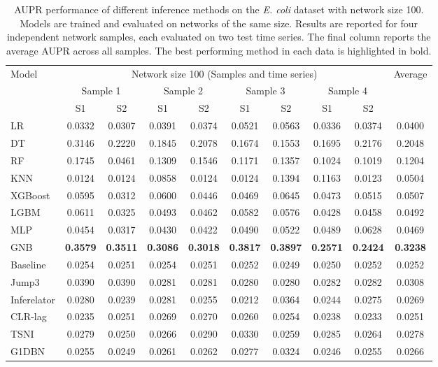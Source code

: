 \begin{table}[!h]
\centering
\caption{AUPR performance of different inference methods on the \textit{E. coli} dataset with network size 100. Models are trained and evaluated on networks of the same size. Results are reported for four independent network samples, each evaluated on two test time series. The final column reports the average AUPR across all samples. The best performing method in each data is highlighted in bold.}
\label{tab:size100}
{\renewcommand{\arraystretch}{0.6}
\setlength{\tabcolsep}{2pt}
\begin{tabular}{lcccccccc c}
\toprule
Model
& \multicolumn{8}{c}{Network size 100 (Samples and time series)}
& Average \\
\cmidrule(lr){2-9}
& \multicolumn{2}{c}{Sample 1}
& \multicolumn{2}{c}{Sample 2}
& \multicolumn{2}{c}{Sample 3}
& \multicolumn{2}{c}{Sample 4}
& \\
\cmidrule(lr){2-3}\cmidrule(lr){4-5}\cmidrule(lr){6-7}\cmidrule(lr){8-9}
& S1 & S2 & S1 & S2 & S1 & S2 & S1 & S2 & \\
\midrule
LR
& 0.0332 & 0.0307 & 0.0391 & 0.0374 & 0.0521 & 0.0563 & 0.0336 & 0.0374 & 0.0400 \\
DT
& 0.3146 & 0.2220 & 0.1845 & 0.2078 & 0.1674 & 0.1553 & 0.1695 & 0.2176 & 0.2048 \\
RF
& 0.1745 & 0.0461 & 0.1309 & 0.1546 & 0.1171 & 0.1357 & 0.1024 & 0.1019 & 0.1204 \\
KNN
& 0.0124 & 0.0124 & 0.0858 & 0.0124 & 0.0124 & 0.1394 & 0.1163 & 0.0123 & 0.0504 \\
XGBoost
& 0.0595 & 0.0312 & 0.0600 & 0.0446 & 0.0469 & 0.0645 & 0.0473 & 0.0515 & 0.0507 \\
LGBM
& 0.0611 & 0.0325 & 0.0493 & 0.0462 & 0.0582 & 0.0576 & 0.0428 & 0.0458 & 0.0492 \\
MLP
& 0.0454 & 0.0317 & 0.0430 & 0.0422 & 0.0490 & 0.0522 & 0.0489 & 0.0628 & 0.0469 \\
GNB
& \textbf{0.3579} & \textbf{0.3511} & \textbf{0.3086} & \textbf{0.3018}
& \textbf{0.3817} & \textbf{0.3897} & \textbf{0.2571} & \textbf{0.2424}
& \textbf{0.3238} \\
\midrule
Baseline
& 0.0254 & 0.0251 & 0.0254 & 0.0251 & 0.0252 & 0.0249 & 0.0250 & 0.0252 & 0.0252 \\
Jump3
& 0.0390 & 0.0390 & 0.0281 & 0.0281 & 0.0280 & 0.0280 & 0.0282 & 0.0282 & 0.0308 \\
Inferelator
& 0.0280 & 0.0239 & 0.0281 & 0.0255 & 0.0212 & 0.0364 & 0.0244 & 0.0275 & 0.0269 \\
CLR-lag
& 0.0235 & 0.0251 & 0.0269 & 0.0270 & 0.0260 & 0.0254 & 0.0238 & 0.0233 & 0.0251 \\
TSNI
& 0.0279 & 0.0250 & 0.0266 & 0.0290 & 0.0330 & 0.0259 & 0.0285 & 0.0264 & 0.0278 \\
G1DBN
& 0.0255 & 0.0249 & 0.0261 & 0.0262 & 0.0277 & 0.0324 & 0.0246 & 0.0255 & 0.0266 \\
\bottomrule
\end{tabular}
}
\end{table}



